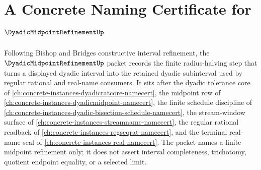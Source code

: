 \chapter{A Concrete Naming Certificate for $\DyadicMidpointRefinementUp$}
\label{ch:concrete-instances-dyadic-midpoint-refinement-namecert}

Following Bishop and Bridges constructive interval refinement, the $\DyadicMidpointRefinementUp$ packet records the finite radius-halving step that turns a displayed dyadic interval into the retained dyadic subinterval used by regular rational and real-name consumers. It sits after the dyadic tolerance core of \autoref{ch:concrete-instances-dyadicratcore-namecert}, the midpoint row of \autoref{ch:concrete-instances-dyadicmidpoint-namecert}, the finite schedule discipline of \autoref{ch:concrete-instances-dyadic-bisection-schedule-namecert}, the stream-window surface of \autoref{ch:concrete-instances-streamname-namecert}, the regular rational readback of \autoref{ch:concrete-instances-regseqrat-namecert}, and the terminal real-name seal of \autoref{ch:concrete-instances-real-namecert}. The packet names a finite midpoint refinement only; it does not assert interval completeness, trichotomy, quotient endpoint equality, or a selected limit.


